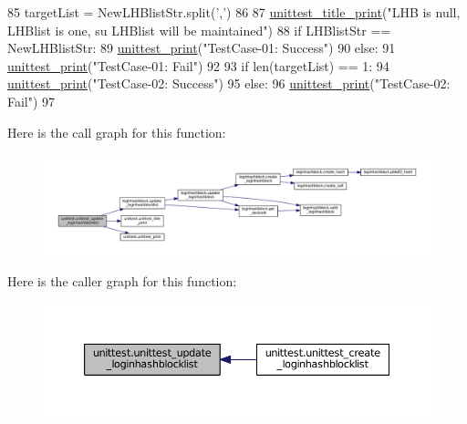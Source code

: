 \begin{DoxyCode}
85     targetList = NewLHBlistStr.split(\textcolor{stringliteral}{','})
86 
87     \hyperlink{namespaceunittest_a642ec5401fe406315f1489d237ba826e}{unittest\_title\_print}(\textcolor{stringliteral}{"LHB is null, LHBlist is one, su LHBlist will be maintained"})
88     \textcolor{keywordflow}{if} LHBlistStr == NewLHBlistStr:
89         \hyperlink{namespaceunittest_a217a1a3af5bc9748f2f6194bf79402bc}{unittest\_print}(\textcolor{stringliteral}{"TestCase-01: Success"})
90     \textcolor{keywordflow}{else}:
91         \hyperlink{namespaceunittest_a217a1a3af5bc9748f2f6194bf79402bc}{unittest\_print}(\textcolor{stringliteral}{"TestCase-01: Fail"})
92 
93     \textcolor{keywordflow}{if} len(targetList) == 1:
94         \hyperlink{namespaceunittest_a217a1a3af5bc9748f2f6194bf79402bc}{unittest\_print}(\textcolor{stringliteral}{"TestCase-02: Success"})
95     \textcolor{keywordflow}{else}:
96         \hyperlink{namespaceunittest_a217a1a3af5bc9748f2f6194bf79402bc}{unittest\_print}(\textcolor{stringliteral}{"TestCase-02: Fail"})
97 
\end{DoxyCode}


Here is the call graph for this function\+:\nopagebreak
\begin{figure}[H]
\begin{center}
\leavevmode
\includegraphics[width=350pt]{namespaceunittest_a9e16eaba67b93461be6ea8ef6332507a_cgraph}
\end{center}
\end{figure}




Here is the caller graph for this function\+:
\nopagebreak
\begin{figure}[H]
\begin{center}
\leavevmode
\includegraphics[width=350pt]{namespaceunittest_a9e16eaba67b93461be6ea8ef6332507a_icgraph}
\end{center}
\end{figure}




